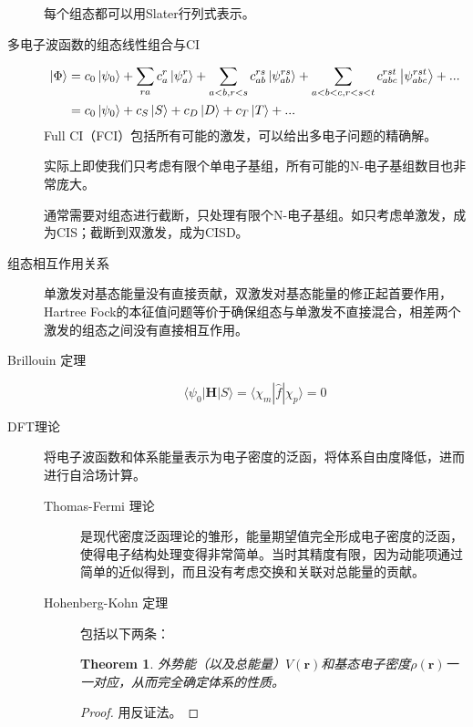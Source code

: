 \documentclass[12pt,a4paper,openany,twoside]{book}
\newtheorem{theorem}{Theorem}[section]
\numberwithin{equation}{section}
\begin{document}
\begin{description}
            每个组态都可以用Slater行列式表示。

          \item[多电子波函数的组态线性组合与CI]
            \begin{align*}
              \ket{\Phi} &= c_0\ket{\psi_0} +\sum_{ra}c_a^r\ket{\psi_a^r}+\sum_{a<b,r<s}c_{ab}^{rs}\ket{\psi_{ab}^{rs}}+\sum_{a<b<c,r<s<t}c^{rst}_{abc}\ket{\psi^{rst}_{abc}}+...\\
              &=c_0\ket{\psi_0} + c_S\ket{S}+c_D\ket{D}+c_T\ket{T}+...
            \end{align*}
            Full CI（FCI）包括所有可能的激发，可以给出多电子问题的精确解。

            实际上即使我们只考虑有限个单电子基组，所有可能的N-电子基组数目也非常庞大。

            通常需要对组态进行截断，只处理有限个N-电子基组。如只考虑单激发，成为CIS；截断到双激发，成为CISD。
        
          \item[组态相互作用关系] 单激发对基态能量没有直接贡献，双激发对基态能量的修正起首要作用，Hartree Fock的本征值问题等价于确保组态与单激发不直接混合，相差两个激发的组态之间没有直接相互作用。
        
          \item[Brillouin 定理]
            \begin{equation}
              \langle\psi_0|\mathbf{H}|S\rangle = \langle \chi_m|\hat{f}|\chi_p\rangle = 0
            \end{equation}

          \item[DFT理论]将电子波函数和体系能量表示为电子密度的泛函，将体系自由度降低，进而进行自洽场计算。
            \begin{description}
              \item[Thomas-Fermi 理论]
                是现代密度泛函理论的雏形，能量期望值完全形成电子密度的泛函，使得电子结构处理变得非常简单。当时其精度有限，因为动能项通过简单的近似得到，而且没有考虑交换和关联对总能量的贡献。

              \item[Hohenberg-Kohn 定理] 包括以下两条：
                \begin{theorem}
                  外势能（以及总能量）$V(\textbf{r})$和基态电子密度$\rho(\textbf{r})$一一对应，从而完全确定体系的性质。
                \end{theorem}
            
                \begin{proof}
                  用反证法。
                  

\end{proof}
\end{description}
\end{description}
\end{document}
